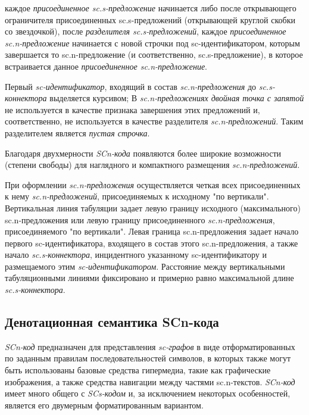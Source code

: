  каждое \textit{присоединенное sc.s-предложение} начинается либо после открывающего ограничителя присоединенных sc.s-предложений (открывающей круглой скобки со звездочкой),  после \textit{разделителя sc.s-предложений},  каждое \textit{присоединенное sc.n-предложение} начинается с новой строчки под sc-идентификатором, которым завершается то sc.n-предложение (и соответственно, sc.s-предложение), в которое встраивается данное \textit{присоединенное sc.n-предложение}.

Первый \textit{sc-идентификатор}, входящий в состав \textit{sc.n-предложения} до \textit{sc.s-коннектора} выделяется  курсивом;
В \textit{sc.n-предложениях двойная точка с запятой} не используется в качестве признака завершения этих предложений и, соответственно, не используется в качестве разделителя \textit{sc.n-предложений}. Таким разделителем является \textit{пустая строчка}.

Благодаря двухмерности \textit{SCn-кода} появляются более широкие возможности (степени свободы) для наглядного и компактного размещения \textit{sc.n-предложений}.

При оформлении \textit{sc.n-предложения} осуществляется четкая  всех присоединенных к нему \textit{sc.n-предложений}, присоединяемых к исходному "по вертикали"{}. Вертикальная линия табуляции задает левую границу исходного (максимального) sc.n-предложения или левую границу присоединенного \textit{sc.n-предложения}, присоединяемого "по вертикали". Левая граница sc.n-предложения задает начало первого sc-идентификатора, входящего в состав этого \mbox{sc.n-предложения}, а также начало \textit{sc.s-коннектора}, инцидентного указанному \mbox{sc-идентификатору} и размещаемого  этим \textit{sc-идентификатором}. Расстояние между вертикальными табуляционными линиями фиксировано и примерно равно максимальной длине \textit{sc.s-коннектора}.

\subsection{Денотационная семантика SCn-кода}
\label{sec_scn_semantics}

\textit{SCn-код} предназначен для представления \textit{sc-графов} в виде отформатированных по заданным правилам последовательностей символов, в которых также могут быть использованы базовые средства гипермедиа, такие как графические изображения, а также средства навигации между частями sc.n-текстов. \textit{SCn-код} имеет много общего с \textit{SCs-кодом} и, за исключением некоторых особенностей, является его двумерным форматированным вариантом.

